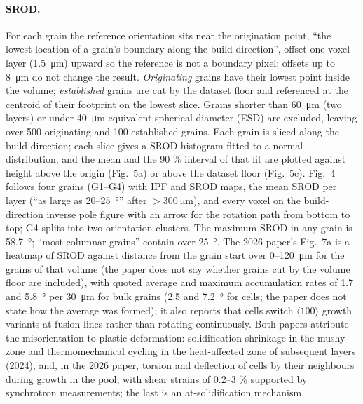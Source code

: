 \documentclass[11pt,a4paper]{article}
\newcommand{\dir}[1]{$\langle #1 \rangle$}
\begin{document}
\paragraph{SROD.} For each grain the reference orientation sits near the origination point, ``the lowest location of a grain's boundary along the build direction'', offset one voxel layer (\SI{1.5}{\micro\metre}) upward so the reference is not a boundary pixel; offsets up to \SI{8}{\micro\metre} do not change the result. \emph{Originating} grains have their lowest point inside the volume; \emph{established} grains are cut by the dataset floor and referenced at the centroid of their footprint on the lowest slice. Grains shorter than \SI{60}{\micro\metre} (two layers) or under \SI{40}{\micro\metre} equivalent spherical diameter (ESD) are excluded, leaving over 500 originating and 100 established grains. Each grain is sliced along the build direction; each slice gives a SROD histogram fitted to a normal distribution, and the mean and the 90 \% interval of that fit are plotted against height above the origin (Fig.~5a) or above the dataset floor (Fig.~5c). Fig.~4 follows four grains (G1--G4) with IPF and SROD maps, the mean SROD per layer (``as large as 20--\SI{25}{\degree}'' after $> \SI{300}{\micro\metre}$), and every voxel on the build-direction inverse pole figure with an arrow for the rotation path from bottom to top; G4 splits into two orientation clusters. The maximum SROD in any grain is \SI{58.7}{\degree}; ``most columnar grains'' contain over \SI{25}{\degree}. The 2026 paper's Fig.~7a is a heatmap of SROD against distance from the grain start over 0--\SI{120}{\micro\metre} for the grains of that volume (the paper does not say whether grains cut by the volume floor are included), with quoted average and maximum accumulation rates of 1.7 and \SI{5.8}{\degree} per \SI{30}{\micro\metre} for bulk grains (2.5 and \SI{7.2}{\degree} for cells; the paper does not state how the average was formed); it also reports that cells switch \dir{100} growth variants at fusion lines rather than rotating continuously. Both papers attribute the misorientation to plastic deformation: solidification shrinkage in the mushy zone and thermomechanical cycling in the heat-affected zone of subsequent layers (2024), and, in the 2026 paper, torsion and deflection of cells by their neighbours during growth in the pool, with shear strains of 0.2--3 \% supported by synchrotron measurements; the last is an at-solidification mechanism.
\end{document}

